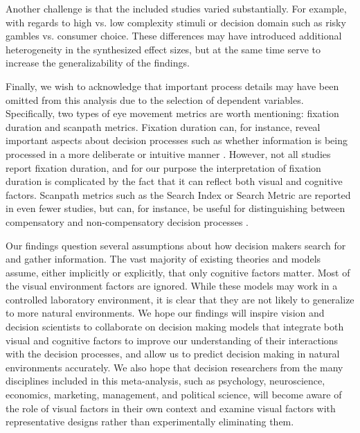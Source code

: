 Another challenge is that the included studies varied substantially. For example, with regards to high vs. low complexity stimuli or decision domain such as risky gambles vs. consumer choice. These differences may have introduced additional heterogeneity in the synthesized effect sizes, but at the same time serve to increase the generalizability of the findings. 

Finally, we wish to acknowledge that important process details may have been omitted from this analysis due to the selection of dependent variables. Specifically, two types of eye movement metrics are worth mentioning: fixation duration and scanpath metrics. Fixation duration can, for instance, reveal important aspects about decision processes such as whether information is being processed in a more deliberate or intuitive manner \citep{horstmann2009}. However, not all studies report fixation duration, and for our purpose the interpretation of fixation duration is complicated by the fact that it can reflect both visual and cognitive factors. Scanpath metrics such as the Search Index or Search Metric \citep{payne1976} are reported in even fewer studies, but can, for instance, be useful for distinguishing between compensatory and non-compensatory decision processes \citep{perkovic2018, schoemann2019}. 



Our findings question several assumptions about how decision makers search for and gather information. The vast majority of existing theories and models assume, either implicitly or explicitly, that only cognitive factors matter. Most of the visual environment factors are ignored. While these models may work in a controlled laboratory environment, it is clear that they are not likely to generalize to more natural environments. We hope our findings will inspire vision and decision scientists to collaborate on decision making models that integrate both visual and cognitive factors to improve our understanding of their interactions with the decision processes, and allow us to predict decision making in natural environments accurately. We also hope that decision researchers from the many disciplines included in this meta-analysis, such as psychology, neuroscience, economics, marketing, management, and political science, will become aware of the role of visual factors in their own context and examine visual factors with representative designs rather than experimentally eliminating them.
